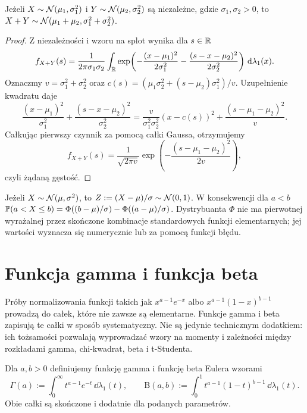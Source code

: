 \begin{stwierdzenie}
Jeżeli $X\sim\mathcal{N}(\mu_1,\sigma_1^2)$ i
$Y\sim\mathcal{N}(\mu_2,\sigma_2^2)$ są niezależne,
gdzie $\sigma_1,\sigma_2>0$, to
$X+Y\sim\mathcal{N}(\mu_1+\mu_2,\sigma_1^2+\sigma_2^2)$.
\end{stwierdzenie}
\begin{proof}
Z niezależności i wzoru na splot wynika dla $s\in\mathbb{R}$
\[
f_{X+Y}(s)=\frac1{2\pi\sigma_1\sigma_2}
\int_{\mathbb{R}}\exp\!\left(-\frac{(x-\mu_1)^2}{2\sigma_1^2}
-\frac{(s-x-\mu_2)^2}{2\sigma_2^2}\right)\,\mathrm{d}\lambda_1(x).
\]
Oznaczmy $v=\sigma_1^2+\sigma_2^2$ oraz
$c(s)=(\mu_1\sigma_2^2+(s-\mu_2)\sigma_1^2)/v$.
Uzupełnienie kwadratu daje
\[
\frac{(x-\mu_1)^2}{\sigma_1^2}
+\frac{(s-x-\mu_2)^2}{\sigma_2^2}
=\frac{v}{\sigma_1^2\sigma_2^2}(x-c(s))^2
+\frac{(s-\mu_1-\mu_2)^2}{v}.
\]
Całkując pierwszy czynnik za pomocą całki Gaussa, otrzymujemy
\[
f_{X+Y}(s)=\frac{1}{\sqrt{2\pi v}}
\exp\!\left(-\frac{(s-\mu_1-\mu_2)^2}{2v}\right),
\]
czyli żądaną gęstość.
\end{proof}

\begin{przyklad}[Standaryzacja]
Jeżeli $X\sim\mathcal{N}(\mu,\sigma^2)$, to
$Z:=(X-\mu)/\sigma\sim\mathcal{N}(0,1)$.
W konsekwencji dla $a<b$
$\mathbb{P}(a<X\leq b)=\Phi((b-\mu)/\sigma)-\Phi((a-\mu)/\sigma)$.
Dystrybuanta $\Phi$ nie ma pierwotnej wyrażalnej przez skończone
kombinacje standardowych funkcji elementarnych; jej wartości
wyznacza się numerycznie lub za pomocą funkcji błędu.
\end{przyklad}

\section{Funkcja gamma i funkcja beta}
Próby normalizowania funkcji takich jak
$x^{a-1}e^{-x}$ albo $x^{a-1}(1-x)^{b-1}$ prowadzą
do całek, które nie zawsze są elementarne. Funkcje gamma i beta
zapisują te całki w sposób systematyczny. Nie są jedynie
technicznym dodatkiem: ich tożsamości pozwalają wyprowadzać
wzory na momenty i zależności między rozkładami gamma,
chi-kwadrat, beta i t-Studenta.

\begin{definicja}
Dla $a,b>0$ definiujemy funkcję gamma i funkcję beta Eulera wzorami
\[
\Gamma(a):=\int_0^\infty t^{a-1}e^{-t}\,\dd\lambda_1(t),
\qquad
\mathrm B(a,b):=\int_0^1 t^{a-1}(1-t)^{b-1}\,\dd\lambda_1(t).
\]
Obie całki są skończone i dodatnie dla podanych parametrów.
\end{definicja}


